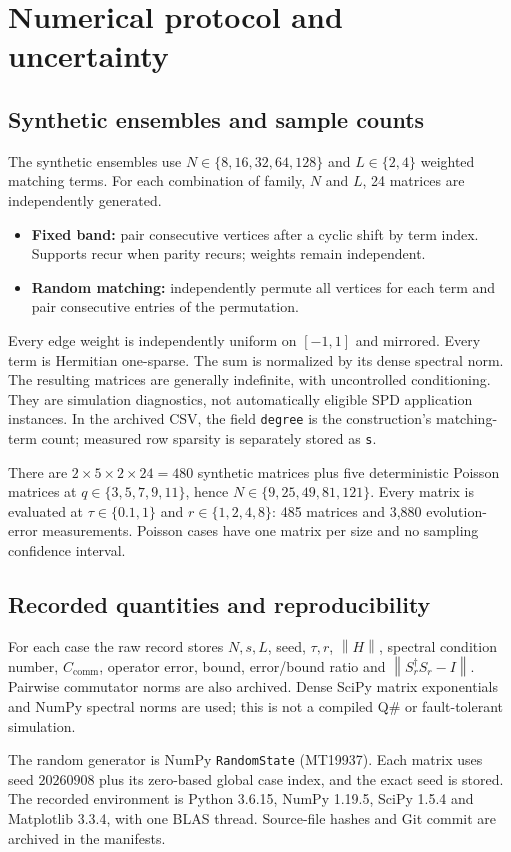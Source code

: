 \documentclass[11pt,a4paper]{article}
\newcommand{\norm}[1]{\left\lVert #1\right\rVert}
\newcommand{\C}{C_{\mathrm{comm}}}
\begin{document}
\section{Numerical protocol and uncertainty}
\subsection{Synthetic ensembles and sample counts}
The synthetic ensembles use $N\in\{8,16,32,64,128\}$ and $L\in\{2,4\}$ weighted matching terms. For each combination of family, $N$ and $L$, 24 matrices are independently generated.
\begin{itemize}
\item \textbf{Fixed band:} pair consecutive vertices after a cyclic shift by term index. Supports recur when parity recurs; weights remain independent.
\item \textbf{Random matching:} independently permute all vertices for each term and pair consecutive entries of the permutation.
\end{itemize}
Every edge weight is independently uniform on $[-1,1]$ and mirrored. Every term is Hermitian one-sparse. The sum is normalized by its dense spectral norm. The resulting matrices are generally indefinite, with uncontrolled conditioning. They are simulation diagnostics, not automatically eligible SPD application instances. In the archived CSV, the field \texttt{degree} is the construction's matching-term count; measured row sparsity is separately stored as \texttt{s}.

There are $2\times5\times2\times24=480$ synthetic matrices plus five deterministic Poisson matrices at $q\in\{3,5,7,9,11\}$, hence $N\in\{9,25,49,81,121\}$. Every matrix is evaluated at $\tau\in\{0.1,1\}$ and $r\in\{1,2,4,8\}$: 485 matrices and 3,880 evolution-error measurements. Poisson cases have one matrix per size and no sampling confidence interval.

\subsection{Recorded quantities and reproducibility}
For each case the raw record stores $N,s,L$, seed, $\tau,r$, $\norm H$, spectral condition number, $\C$, operator error, bound, error/bound ratio and $\norm{S_r^\dagger S_r-I}$. Pairwise commutator norms are also archived. Dense SciPy matrix exponentials and NumPy spectral norms are used; this is not a compiled Q\# or fault-tolerant simulation.

The random generator is NumPy \texttt{RandomState} (MT19937). Each matrix uses seed $20260908$ plus its zero-based global case index, and the exact seed is stored. The recorded environment is Python 3.6.15, NumPy 1.19.5, SciPy 1.5.4 and Matplotlib 3.3.4, with one BLAS thread. Source-file hashes and Git commit are archived in the manifests.
\end{document}

